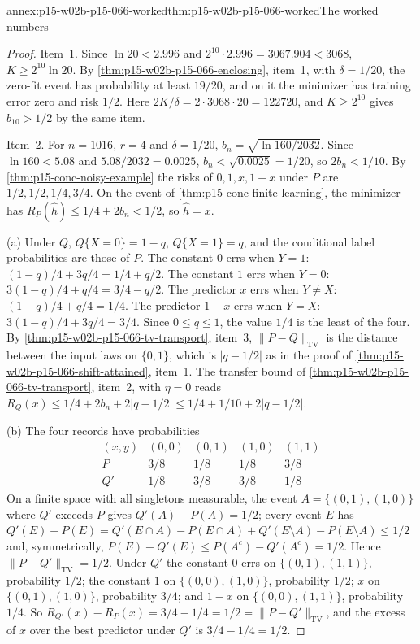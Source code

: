 \begin{annexitem}{annex:p15-w02b-p15-066-worked}{thm:p15-w02b-p15-066-worked}{The worked numbers}
\begin{proof}
Item~1. Since \(\ln20<2.996\) and \(2^{10}\cdot2.996=3067.904<3068\),
\(K\geq2^{10}\ln20\). By \cref{thm:p15-w02b-p15-066-enclosing}, item~1,
with \(\delta=1/20\), the zero-fit event has probability at least
\(19/20\), and on it the minimizer has training error zero and risk
\(1/2\). Here \(2K/\delta=2\cdot3068\cdot20=122720\), and
\(K\geq2^{10}\) gives \(b_{10}>1/2\) by the same item.

Item~2. For \(n=1016\), \(r=4\) and \(\delta=1/20\),
\(b_n=\sqrt{\ln160/2032}\). Since \(\ln160<5.08\) and
\(5.08/2032=0.0025\), \(b_n<\sqrt{0.0025}=1/20\), so \(2b_n<1/10\). By
\cref{thm:p15-conc-noisy-example} the risks of \(0,1,x,1-x\) under \(P\)
are \(1/2,1/2,1/4,3/4\). On the event of
\cref{thm:p15-conc-finite-learning}, the minimizer has
\(R_P(\widehat h)\leq1/4+2b_n<1/2\), so \(\widehat h=x\).

(a) Under \(Q\), \(Q\{X=0\}=1-q\), \(Q\{X=1\}=q\), and the conditional
label probabilities are those of \(P\). The constant \(0\) errs when
\(Y=1\): \((1-q)/4+3q/4=1/4+q/2\). The constant \(1\) errs when
\(Y=0\): \(3(1-q)/4+q/4=3/4-q/2\). The predictor \(x\) errs when
\(Y\ne X\): \((1-q)/4+q/4=1/4\). The predictor \(1-x\) errs when
\(Y=X\): \(3(1-q)/4+3q/4=3/4\). Since \(0\leq q\leq1\), the value \(1/4\)
is the least of the four. By \cref{thm:p15-w02b-p15-066-tv-transport},
item~3, \(\|P-Q\|_{\mathrm{TV}}\) is the distance between the input laws
on \(\{0,1\}\), which is \(|q-1/2|\) as in the proof of
\cref{thm:p15-w02b-p15-066-shift-attained}, item~1. The transfer bound
of \cref{thm:p15-w02b-p15-066-tv-transport}, item~2, with \(\eta=0\)
reads \(R_Q(x)\leq1/4+2b_n+2|q-1/2|\leq1/4+1/10+2|q-1/2|\).

(b) The four records have probabilities
\[
 \begin{array}{c|cccc}
 (x,y)&(0,0)&(0,1)&(1,0)&(1,1)\\\hline
 P&3/8&1/8&1/8&3/8\\
 Q'&1/8&3/8&3/8&1/8
 \end{array}
\]
On a finite space with all singletons measurable, the event
\(A=\{(0,1),(1,0)\}\) where \(Q'\) exceeds \(P\) gives
\(Q'(A)-P(A)=1/2\); every event \(E\) has
\(Q'(E)-P(E)=Q'(E\cap A)-P(E\cap A)+Q'(E\setminus A)-P(E\setminus A)\leq1/2\)
and, symmetrically, \(P(E)-Q'(E)\leq P(A^c)-Q'(A^c)=1/2\). Hence
\(\|P-Q'\|_{\mathrm{TV}}=1/2\). Under \(Q'\) the constant \(0\) errs on
\(\{(0,1),(1,1)\}\), probability \(1/2\); the constant \(1\) on
\(\{(0,0),(1,0)\}\), probability \(1/2\); \(x\) on
\(\{(0,1),(1,0)\}\), probability \(3/4\); and \(1-x\) on
\(\{(0,0),(1,1)\}\), probability \(1/4\). So
\(R_{Q'}(x)-R_P(x)=3/4-1/4=1/2=\|P-Q'\|_{\mathrm{TV}}\), and the excess
of \(x\) over the best predictor under \(Q'\) is \(3/4-1/4=1/2\).
\end{proof}
\end{annexitem}
